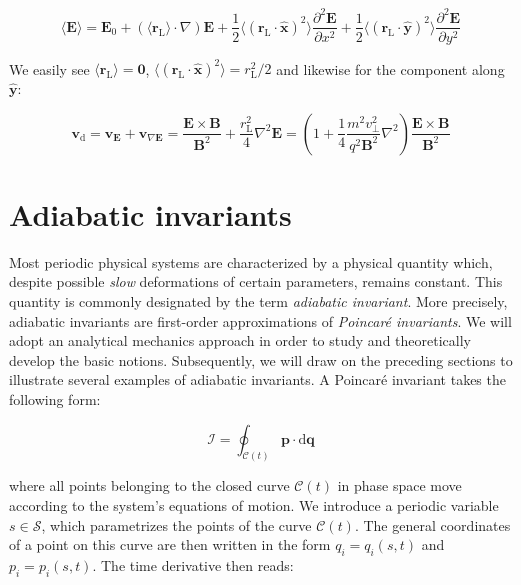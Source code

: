 \begin{equation}
    \langle\mathbf{E}\rangle=\mathbf{E}_0+(\langle\mathbf{r}_\text{L}\rangle\cdot\nabla)\mathbf{E}+\frac{1}{2}\langle(\mathbf{r}_\text{L}\cdot\mathbf{\hat{x}})^2\rangle\frac{\partial^2\mathbf{E}}{\partial x^2}+\frac{1}{2}\langle(\mathbf{r}_\text{L}\cdot\mathbf{\hat{y}})^2\rangle\frac{\partial^2\mathbf{E}}{\partial y^2}
\end{equation}

We easily see $\langle\mathbf{r}_\text{L}\rangle=\mathbf{0}$, $\langle(\mathbf{r}_\text{L}\cdot\mathbf{\hat{x}})^2\rangle=r_\text{L}^2/2$ and likewise for the component along $\mathbf{\hat{y}}$:

\begin{equation}
    \mathbf{v}_\mathrm{d}=\mathbf{v}_\mathbf{E}+\mathbf{v}_{\nabla\mathbf{E}}=\frac{\mathbf{E}\times\mathbf{B}}{\mathbf{B}^2}+\frac{r_\text{L}^2}{4}\nabla^2\mathbf{E}=\left(1+\frac{1}{4}\frac{m^2v_\perp^2}{q^2\mathbf{B}^2}\nabla^2\right)\frac{\mathbf{E}\times\mathbf{B}}{\mathbf{B}^2}
\end{equation}

\section{Adiabatic invariants}

Most periodic physical systems are characterized by a physical quantity which, despite possible \textit{slow} deformations of certain parameters, remains constant. This quantity is commonly designated by the term \textit{adiabatic invariant}. More precisely, adiabatic invariants are first-order approximations of \textit{Poincaré invariants}. We will adopt an analytical mechanics approach in order to study and theoretically develop the basic notions. Subsequently, we will draw on the preceding sections to illustrate several examples of adiabatic invariants. A Poincaré invariant takes the following form:

\begin{equation}
    \mathcal{I}=\oint_{\mathcal{C}(t)}\mathbf{p}\cdot\mathrm{d}\mathbf{q}
\end{equation}

where all points belonging to the closed curve $\mathcal{C}(t)$ in phase space move according to the system's equations of motion. We introduce a periodic variable $s\in\mathcal{S}$, which parametrizes the points of the curve $\mathcal{C}(t)$. The general coordinates of a point on this curve are then written in the form $q_i = q_i(s,t)$ and $p_i = p_i(s,t)$. The time derivative then reads:

